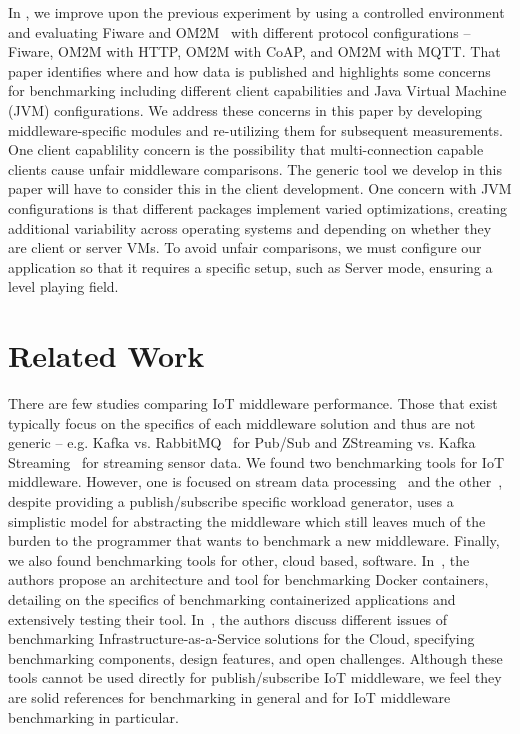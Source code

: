 \documentclass[conference]{IEEEtran}
\begin{document}
In \cite{pereira_benchmarking_2018}, we improve upon the previous experiment by using a controlled environment %
and evaluating Fiware and OM2M~\cite{oneM2MHo30:online} with different protocol configurations -- Fiware, OM2M with HTTP, OM2M with CoAP, and OM2M with MQTT. That paper identifies where and how data is published and highlights some concerns for benchmarking including different client capabilities and Java Virtual Machine (JVM) configurations. %
We address these concerns in this paper by developing middleware-specific modules and re-utilizing them for subsequent measurements. One client capablility concern is the possibility that multi-connection capable clients cause unfair middleware comparisons. The generic tool we develop in this paper will have to consider this in the client development. One concern with JVM configurations is that different packages implement varied optimizations, creating additional variability across operating systems and depending on whether they are client or server VMs. To avoid unfair comparisons, we must configure our application so that it requires a specific setup, such as Server mode, ensuring a level playing field.

\section{Related Work}

There are few studies comparing IoT middleware performance. Those that exist typically focus on the specifics of each middleware solution and thus are not generic -- e.g. Kafka vs. RabbitMQ~\cite{dobbelaere_kafka_2017} for Pub/Sub and ZStreaming vs. Kafka Streaming~\cite{fernandez-rodraguez_benchmarking_2017} for streaming sensor data. We found two benchmarking tools for IoT middleware. However, one is focused on stream data processing~\cite{shukla_riotbench:_2017} and the other~\cite{zhang_psbench:_2014}, despite providing a publish/subscribe specific workload generator, uses a simplistic model for abstracting the middleware which still leaves much of the burden to the programmer that wants to benchmark a new middleware. Finally, we also found benchmarking tools for other, cloud based, software. In~\cite{varghese_doclite:_2016}, the authors propose an architecture and tool for benchmarking Docker containers, detailing on the specifics of benchmarking containerized applications and extensively testing their tool. In~\cite{iosup_iaas_2014}, the authors discuss different issues of benchmarking Infrastructure-as-a-Service solutions for the Cloud, specifying benchmarking components, design features, and open challenges. Although these tools cannot be used directly for publish/subscribe IoT middleware, we feel they are solid references for benchmarking in general and for IoT middleware benchmarking in particular.
\end{document}
